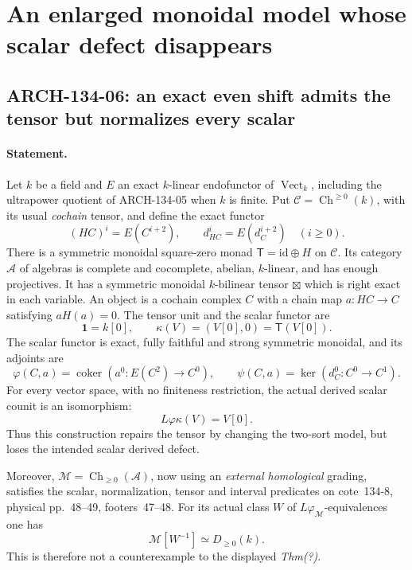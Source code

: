 \section{An enlarged monoidal model whose scalar defect disappears}
\label{sec:arch134-even-shift}

\subsection{ARCH-134-06: an exact even shift admits the tensor but normalizes every scalar}

\paragraph{Statement.}
Let $k$ be a field and $E$ an exact $k$-linear endofunctor of
$\operatorname{Vect}_k$, including the ultrapower quotient of
ARCH-134-05 when $k$ is finite.  Put
$\mathcal C=\operatorname{Ch}^{\ge0}(k)$, with its usual
\emph{cochain} tensor, and define the exact functor
\[
        (HC)^i=E(C^{i+2}),\qquad d_{HC}^i=E(d_C^{i+2})
                         \quad(i\ge0).
 \tag{ARCH134.S1}
\]
There is a symmetric monoidal square-zero monad
$\mathsf T=\mathrm{id}\oplus H$ on $\mathcal C$.
Its category $\mathcal A$ of algebras is complete and cocomplete,
abelian, $k$-linear, and has enough projectives.  It has a
symmetric monoidal $k$-bilinear tensor $\boxtimes$ which is right
exact in each variable.  An object is a cochain complex $C$ with
a chain map $a:HC\to C$ satisfying $aH(a)=0$.
The tensor unit and the scalar functor are
\[
       \mathbf1=k[0],\qquad \kappa(V)=(V[0],0)
                                  =\mathsf T(V[0]).
 \tag{ARCH134.S2}
\]
The scalar functor is exact, fully faithful and strong symmetric
monoidal, and its adjoints are
\[
 \varphi(C,a)=\operatorname{coker}(a^0:E(C^2)\to C^0),
 \qquad \psi(C,a)=\ker(d_C^0:C^0\to C^1).
 \tag{ARCH134.S3}
\]
For every vector space, with no finiteness restriction, the
actual derived scalar counit is an isomorphism:
\[
                L\varphi\kappa(V)=V[0].
 \tag{ARCH134.S4}
\]
Thus this construction repairs the tensor by changing the
two-sort model, but loses the intended scalar derived defect.

Moreover, $\mathcal M=\operatorname{Ch}_{\ge0}(\mathcal A)$,
now using an \emph{external homological} grading, satisfies the
scalar, normalization, tensor and interval predicates on
cote~134-8, physical pp.~48--49, footers~47--48.  For its actual
class $W$ of $L\varphi_{\mathcal M}$-equivalences one has
\[
                   \mathcal M[W^{-1}]\simeq D_{\ge0}(k).
 \tag{ARCH134.S5}
\]
This is therefore not a counterexample to the displayed
\emph{Thm(?)}.

